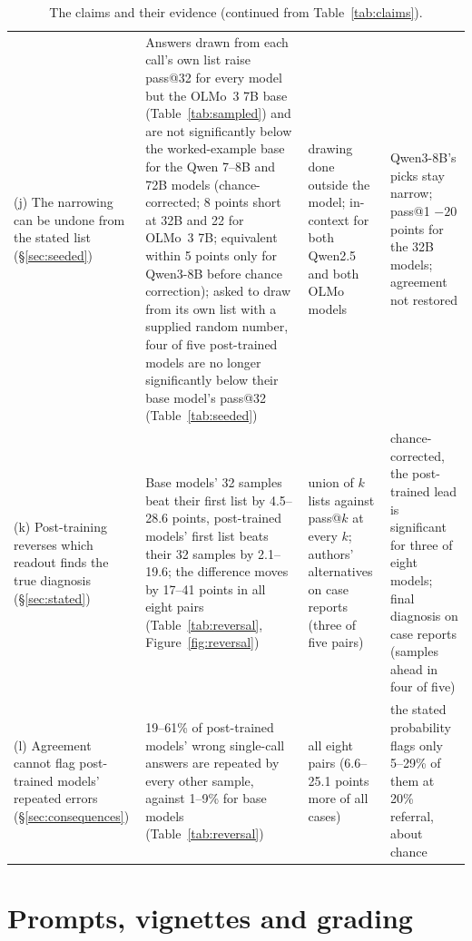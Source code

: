 \documentclass[wcp]{jmlr}
\begin{document}
\begin{table}[p]
\begin{tabular}{L{2.8cm}L{4.6cm}L{3.4cm}L{3.6cm}}
(j) The narrowing can be undone from the stated list (\S\ref{sec:seeded}) & Answers drawn from each call's own list raise pass@32 for every model but the OLMo~3 7B base (Table~\ref{tab:sampled}) and are not significantly below the worked-example base for the Qwen 7--8B and 72B models (chance-corrected; 8 points short at 32B and 22 for OLMo~3 7B; equivalent within 5 points only for Qwen3-8B before chance correction); asked to draw from its own list with a supplied random number, four of five post-trained models are no longer significantly below their base model's pass@32 (Table~\ref{tab:seeded}) & drawing done outside the model; in-context for both Qwen2.5 and both OLMo models & Qwen3-8B's picks stay narrow; pass@1 $-20$ points for the 32B models; agreement not restored \\
(k) Post-training reverses which readout finds the true diagnosis (\S\ref{sec:stated}) & Base models' 32 samples beat their first list by 4.5--28.6 points, post-trained models' first list beats their 32 samples by 2.1--19.6; the difference moves by 17--41 points in all eight pairs (Table~\ref{tab:reversal}, Figure~\ref{fig:reversal}) & union of $k$ lists against pass@$k$ at every $k$; authors' alternatives on case reports (three of five pairs) & chance-corrected, the post-trained lead is significant for three of eight models; final diagnosis on case reports (samples ahead in four of five) \\
(l) Agreement cannot flag post-trained models' repeated errors (\S\ref{sec:consequences}) & 19--61\% of post-trained models' wrong single-call answers are repeated by every other sample, against 1--9\% for base models (Table~\ref{tab:reversal}) & all eight pairs (6.6--25.1 points more of all cases) & the stated probability flags only 5--29\% of them at 20\% referral, about chance \\
\bottomrule
\end{tabular}
\caption{The claims and their evidence (continued from Table~\ref{tab:claims}).}
\label{tab:claims2}
\end{table}
\clearpage

\sloppy
\section{Prompts, vignettes and grading}\label{app:prompts}
\sloppy
\end{document}
